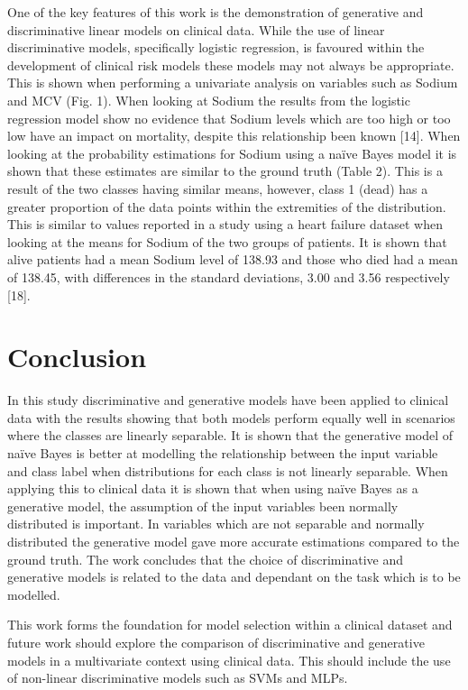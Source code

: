 \documentclass[a4paper,UKenglish]{oasics-v2016}
\begin{document}
One of the key features of this work is the demonstration of generative and discriminative linear models on clinical data. While the use of linear discriminative models, specifically logistic regression, is favoured within the development of clinical risk models these models may not always be appropriate. This is shown when performing a univariate analysis on variables such as Sodium and MCV (Fig. 1). When looking at Sodium the results from the logistic regression model show no evidence that Sodium levels which are too high or too low have an impact on mortality, despite this relationship been known [14]. When looking at the probability estimations for Sodium using a naïve Bayes model it is shown that these estimates are similar to the ground truth (Table 2). This is a result of the two classes having similar means, however, class 1 (dead) has a greater proportion of the data points within the extremities of the distribution. This is similar to values reported in a study using a heart failure dataset when looking at the means for Sodium of the two groups of patients. It is shown that alive patients had a mean Sodium level of 138.93 and those who died had a mean of 138.45, with differences in the standard deviations, 3.00 and 3.56 respectively [18].


\section{Conclusion}
In this study discriminative and generative models have been applied to clinical data with the results showing that both models perform equally well in scenarios where the classes are linearly separable. It is shown that the generative model of naïve Bayes is better at modelling the relationship between the input variable and class label when distributions for each class is not linearly separable. When applying this to clinical data it is shown that when using naïve Bayes as a generative model, the assumption of the input variables been normally distributed is important. In variables which are not separable and normally distributed the generative model gave more accurate estimations compared to the ground truth. The work concludes that the choice of discriminative and generative models is related to the data and dependant on the task which is to be modelled.

This work forms the foundation for model selection within a clinical dataset and future work should explore the comparison of discriminative and generative models in a multivariate context using clinical data. This should include the use of non-linear discriminative models such as SVMs and MLPs.
\end{document}
